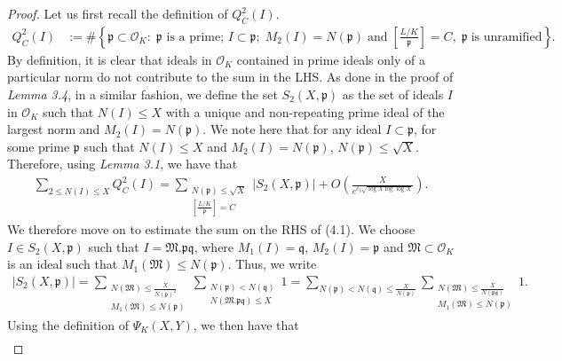 \documentclass[12pt]{article}
\numberwithin{equation}{section}
\numberwithin{equation}{section}
\begin{document}
    \begin{proof}
        Let us first recall the definition of $Q^2_C(I)$.
        \begin{align}
             Q_C^2(I) &:= \# \left\{\mathfrak{p} \subset \mathcal{O}_K :\; \mathfrak{p}\text{ is a prime; } I\subset \mathfrak{p}; \;M_2(I)=N(\mathfrak{p})\;\text{and}\;\left[\frac{L/K}{\mathfrak{p}}\right]=C,\;\mathfrak{p}\;\text{is unramified}\right\} .\nonumber
        \end{align}
        By definition, it is clear that ideals in $\mathcal{O}_K$ contained in prime ideals only of a particular norm do not contribute to the sum in the LHS. As done in the proof of \textit{Lemma 3.4}, in a similar fashion, we define the set $S_2(X,\mathfrak{p})$ as the set of ideals $I$ in $\mathcal{O}_K$ such that $N(I) \leq X$ with a unique and non-repeating prime ideal of the largest norm and $M_2(I)=N(\mathfrak{p})$. We note here that for any ideal $I \subset \mathfrak{p}$, for some prime $\mathfrak{p}$ such that $N(I)\leq X$ and $M_2(I)=N(\mathfrak{p})$, $N(\mathfrak{p}) \leq \sqrt{X}$. Therefore, using \textit{Lemma 3.1}, we have that
        \begin{align}
             \sum_{2\leq N(I)\leq X} Q_C^2(I) = \sum_{\substack{N(\mathfrak{p})\leq \sqrt{X} \\ \left[\frac{L/K}{\mathfrak{p}}\right]=C}} |S_2(X,\mathfrak{p})| +  O\left(\frac{X}{e^{c_3\sqrt{\log X\log\log X}}}\right).
        \end{align}
        We therefore move on to estimate the sum on the RHS of (4.1). We choose $I \in S_2(X,\mathfrak{p})$ such that $I=\mathfrak{M.pq}$, where $M_1(I)=\mathfrak{q}$, $M_2(I)=\mathfrak{p}$ and $\mathfrak{M} \subset \mathcal{O}_K$ is an ideal such that $M_1(\mathfrak{M})\leq N(\mathfrak{p})$. Thus, we write
        \begin{align}
            |S_2(X,\mathfrak{p})| = \sum_{\substack{N(\mathfrak{M}) \leq \frac{X}{N(\mathfrak{p})^2} \\ M_1(\mathfrak{M}) \leq N(\mathfrak{p})}} \sum_{\substack{N(\mathfrak{p})<N(\mathfrak{q}) \\ N(\mathfrak{M.pq}) \leq X}} 1 = \sum_{N(\mathfrak{p})<N(\mathfrak{q})\leq \frac{X}{N(\mathfrak{p})}} \sum_{\substack{N(\mathfrak{M})\leq \frac{X}{N(\mathfrak{pq})} \\ M_1(\mathfrak{M}) \leq N(\mathfrak{p})}} 1 .
        \end{align}
    Using the definition of $\Psi_K(X,Y)$, we then have that 
    \begin{align}

\end{align}
\end{proof}
\end{document}
